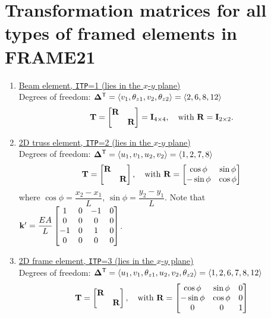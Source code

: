 \section{Transformation matrices for all types of framed elements in FRAME21}
\begin{enumerate}[leftmargin=*]
  \item \underline{Beam element, \texttt{ITP}=1 (lies in the $x$-$y$ plane)}\\
    Degrees of freedom: $\bm{\Delta}^{\mathsf{T}} = \langle v_1, \theta_{z1}, v_2, \theta_{z2}\rangle = \langle 2, 6, 8, 12\rangle$
    \begin{equation*}
      \mathbf{T} = \begin{bmatrix}\mathbf{R} & \\ & \mathbf{R}\end{bmatrix} = \mathbf{I}_{4\times4},\quad\text{with } \mathbf{R} = \mathbf{I}_{2\times2}.
    \end{equation*}

  \item \underline{2D truss element, \texttt{ITP}=2 (lies in the $x$-$y$ plane)}\\
    Degrees of freedom: $\bm{\Delta}^{\mathsf{T}} = \langle u_1, v_1, u_2, v_2\rangle = \langle 1, 2, 7, 8\rangle$
    \begin{equation*}
      \mathbf{T} = \begin{bmatrix}\mathbf{R} & \\ & \mathbf{R}\end{bmatrix},\quad\text{with } \mathbf{R} = \begin{bmatrix}\cos\phi & \sin\phi\\ -\sin\phi & \cos\phi\end{bmatrix}
    \end{equation*}
    where $\cos\phi = \dfrac{x_2-x_1}{L}$, $\sin\phi = \dfrac{y_2-y_1}{L}$. Note that
    $\mathbf{k}' = \dfrac{EA}{L}\begin{bmatrix}1 & 0 & -1 & 0\\ 0 & 0 & 0 & 0\\ -1 & 0 & 1 & 0\\ 0 & 0 & 0 & 0\end{bmatrix}$.

  \item \underline{2D frame element, \texttt{ITP}=3 (lies in the $x$-$y$ plane)}\\
    Degrees of freedom: $\bm{\Delta}^{\mathsf{T}} = \langle u_1, v_1, \theta_{z1}, u_2, v_2, \theta_{z2}\rangle = \langle 1, 2, 6, 7, 8, 12\rangle$
    \begin{equation*}
      \mathbf{T} = \begin{bmatrix}\mathbf{R} & \\ & \mathbf{R}\end{bmatrix},\quad\text{with } \mathbf{R} = \begin{bmatrix}\cos\phi & \sin\phi & 0\\ -\sin\phi & \cos\phi & 0\\ 0 & 0 & 1\end{bmatrix}
    \end{equation*}


\end{enumerate}

